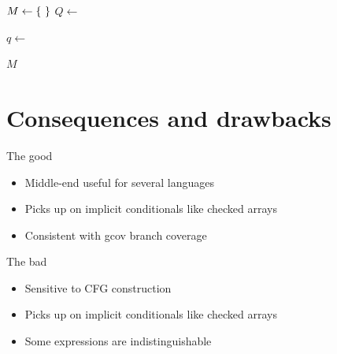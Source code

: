 \documentclass[xcolor = {dvipsnames, table}]{beamer}
\begin{document}
\begin{frame}
      \begin{algorithmic}[1]
          \State $M \gets \set{}$
                  \State $Q \gets$ 
                  \State {}

                  \Repeat
                      \State $q \gets$ 
                      \State {}
                      \State {}

                          \State {}
                      \EndFor

              \EndFor
          \EndFor
          \State \Return $M$
      \EndFunction
  \end{algorithmic}
\end{frame}

\section{Consequences and drawbacks}

\begin{frame}
    \begin{block}{The good}
        \begin{itemize}
            \item Middle-end useful for several languages
            \item Picks up on implicit conditionals like checked arrays
            \item Consistent with gcov branch coverage
        \end{itemize}
    \end{block}
\end{frame}

\begin{frame}
    \begin{block}{The bad}
        \begin{itemize}
            \item Sensitive to CFG construction
            \item Picks up on implicit conditionals like checked arrays
            \item Some expressions are indistinguishable
        \end{itemize}
    \end{block}
\end{frame}
\end{document}
